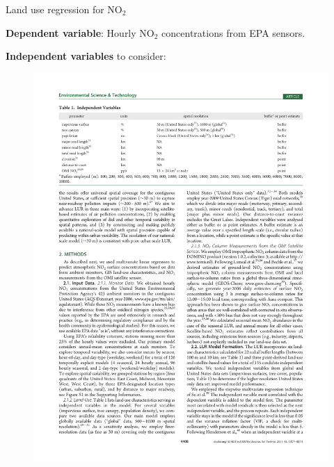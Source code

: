 \documentclass[aspectratio=169]{beamer}
\begin{document}
\begin{frame}{Land use regression for NO$_2$}

\textbf{Dependent variable}: Hourly NO$_2$ concentrations from EPA sensors.

\vspace{3mm}
\textbf{Independent variables} to consider:
\vspace{-5mm}
\begin{figure}
\includegraphics[height=0.6\textheight]{novotny_tab1_1}

\end{figure}
\end{frame}
\end{document}
